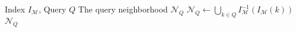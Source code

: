 \begin{algorithm}[!h]
	\begin{algorithmic}[1]
		\Require Index $I_{\mathcal{M}}$, Query $Q$
		\Ensure The query neighborhood $\mathcal{N}_Q$
		\State $\mathcal{N}_Q \leftarrow \bigcup_{k \in Q}I_{\mathcal{M}}^{-1}(I_{\mathcal{M}}(k))$\;
		\State \Return $\mathcal{N}_Q$
	\end{algorithmic}
	\caption{$\texttt{search}(I_{\mathcal{M}}, Q)$}\label{alg:search}
\end{algorithm}
